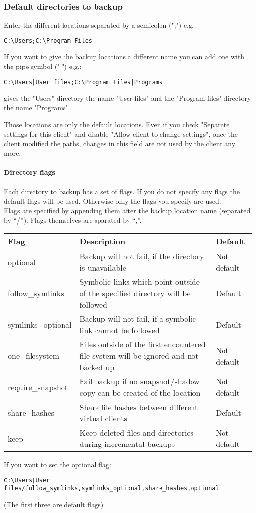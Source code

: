 \documentclass[a4paper,10pt]{article}
\begin{document}
\subsubsection{Default directories to backup}
\label{subsub_default_dirs}

Enter the different locations separated by a semicolon (";") e.g.
\begin{verbatim}
C:\Users;C:\Program Files
\end{verbatim}
If you want to give the backup locations a different name you can add one with the pipe symbol ("|") e.g.:
\begin{verbatim}
C:\Users|User files;C:\Program Files|Programs
\end{verbatim}
gives the "Users" directory the name "User files" and the "Program files" directory the name "Programs".

Those locations are only the default locations. Even if you check "Separate settings for this client" and disable "Allow client to change settings", once the client modified the paths, changes in this field are not used by the client any more.

\paragraph{Directory flags}
Each directory to backup has a set of flags. If you do not specify any flags the default flags will be used. Otherwise only the flags you specify are used.\\
Flags are specified by appending them after the backup location name (separated by ``/''). Flags themselves are sparated by ``,''.

\begin{tabular}{|p{}|p{}|p{}|}
\hline
Flag & Description & Default\\
\hline\hline
optional & Backup will not fail, if the directory is unavailable & Not default\\
\hline
follow\_symlinks & Symbolic links which point outside of the specified directory will be followed & Default\\
\hline
symlinks\_optional & Backup will not fail, if a symbolic link cannot be followed & Default\\
\hline
one\_filesystem & Files outside of the first encountered file system will be ignored and not backed up & Not default \\
\hline
require\_snapshot & Fail backup if no snapshot/shadow copy can be created of the location & Not default\\
\hline
share\_hashes & Share file hashes between different virtual clients & Default\\
\hline
keep & Keep deleted files and directories during incremental backups & Not default\\
\hline
\end{tabular}
\par\null\par
\noindent If you want to set the optional flag:
\begin{verbatim}
C:\Users|User files/follow_symlinks,symlinks_optional,share_hashes,optional
\end{verbatim}
(The first three are default flags)
\end{document}
